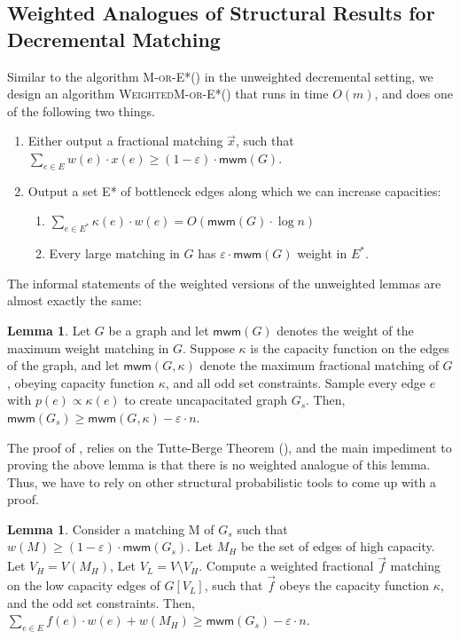 \documentclass[a4paper,11pt]{article}
\newcommand{\eps}{\varepsilon}
\theoremstyle{definition}
\theoremstyle{definition}
\theoremstyle{definition}
\theoremstyle{definition}
\theoremstyle{definition}
\newtheorem{lemma2}[definition2]{Lemma}
\theoremstyle{definition}
\theoremstyle{definition}
\theoremstyle{definition}
\theoremstyle{definition}
\theoremstyle{definition}
\theoremstyle{definition}
\theoremstyle{definition}
\theoremstyle{definition}
\theoremstyle{definition}
\theoremstyle{definition}
\begin{document}
\subsection{Weighted Analogues of Structural Results for Decremental Matching}

Similar to the algorithm \textsc{M-or-E*}() in the unweighted decremental setting, we design an algorithm \textsc{WeightedM-or-E*}() that runs in time $O(m)$, and does one of the following two things.

\begin{enumerate}
\item Either output a fractional matching $\vec{x}$, such that $\sum_{e\in E}w(e)\cdot x(e)\geqslant (1-\eps)\cdot \textsf{mwm}(G)$.
\item Output a set E* of bottleneck edges along which we can increase capacities:
\begin{enumerate}[label=(\roman*)]
\item $\sum_{e\in E^*}\kappa(e)\cdot w(e)=O(\textsf{mwm}(G)\cdot\log n)$
\item Every large matching in $G$ has $\eps\cdot \textsf{mwm}(G)$ weight in $E^*$.
\end{enumerate}
\end{enumerate}

The informal statements of the weighted versions of the unweighted lemmas are almost exactly the same:

\begin{lemma2}
Let $G$ be a graph and let $\textsf{mwm}(G)$ denotes the weight of the maximum weight matching in $G$. Suppose $\kappa$ is the capacity function on the edges of the graph, and let $\textsf{mwm}(G,\kappa)$ denote the maximum fractional matching of $G$, obeying capacity function $\kappa$, and all odd set constraints. Sample every edge $e$ with $p(e) \propto \kappa(e)$ to create uncapacitated graph $G_s$. Then, $\textsf{mwm}(G_s)\geqslant \textsf{mwm}(G,\kappa)-\eps\cdot n$.
\end{lemma2}

The proof of , relies on the Tutte-Berge Theorem (\cite{Schrijver2003CombinatorialOP}), and the main impediment to proving the above lemma is that there is no weighted analogue of this lemma. Thus, we have to rely on other structural probabilistic tools to come up with a proof.

\begin{lemma2}
Consider a matching M of $G_s$ such that $w(M)\geqslant (1-\eps)\cdot \textsf{mwm}(G_s)$. Let $M_H$ be the set of edges of high capacity. Let $V_H=V(M_H)$, Let $V_L=V\setminus V_H$. Compute a weighted fractional $\vec{f}$ matching on the low capacity edges of $G[V_L]$, such that $\vec{f}$ obeys the capacity function $\kappa$, and the odd set constraints. Then, $\sum_{e\in E}f(e)\cdot w(e)+w(M_H)\geqslant  \textsf{mwm}(G_s)-\eps\cdot n$.
\end{lemma2}
\end{document}
